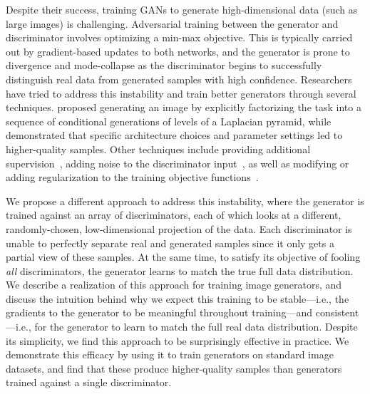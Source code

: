 \documentclass{article}
\begin{document}
Despite their success, training GANs to generate high-dimensional data (such as large images) is challenging. Adversarial training between the generator and discriminator involves optimizing a min-max objective. This is typically carried out by gradient-based updates to both networks, and the generator is prone to divergence and mode-collapse as the discriminator begins to successfully distinguish real data from generated samples with high confidence. Researchers have tried to address this instability and train better generators through several techniques. \citet{denton2015deep} proposed generating an image by explicitly factorizing the task into a sequence of conditional generations of levels of a Laplacian pyramid, while \citet{radford2015unsupervised} demonstrated that specific architecture choices and parameter settings led to higher-quality samples.  Other techniques include providing additional supervision~\citep{salimans2016improved}, adding noise to the discriminator input~\citep{arjovsky2017towards}, as well as modifying or adding regularization to the training objective functions~\citep{nowozin2016f,arjovsky2017wasserstein,zhao2016energy}.


We propose a different approach to address this instability, where  the generator is trained against an array of discriminators, each of which looks at a different, randomly-chosen, low-dimensional projection of the data. Each discriminator is unable to perfectly separate real and generated samples since it only gets a partial view of these samples. At the same time, to satisfy its objective of fooling \emph{all} discriminators, the generator learns to match the true full data distribution. We describe a realization of this approach for training image generators, and discuss the intuition behind why we expect this training to be stable---i.e., the gradients to the generator to be meaningful throughout training---and consistent---i.e., for the generator to learn to match the full real data distribution.  Despite its simplicity, we find this approach to be surprisingly effective in practice. We demonstrate this efficacy by using it to train generators on standard image datasets, and find that these produce higher-quality samples than generators trained against a single discriminator.
\end{document}

